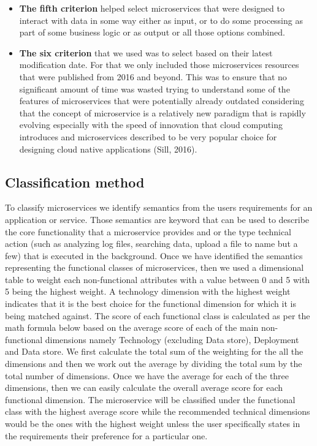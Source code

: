 \documentclass{article}
\begin{document}
\begin{itemize}
\item \textbf{The fifth criterion} helped select microservices that were designed to interact with data in some way either as input, or to do some processing as part of some business logic or as output or all those options combined.


\item \textbf{The six criterion} that we used was to select based on their latest modification date. For that we only included those microservices resources that were published from 2016 and beyond. This was to ensure that no significant amount of time was wasted trying to understand some of the features of microservices that were potentially already outdated considering that the concept of microservice is a relatively new paradigm that is rapidly evolving especially with the speed of innovation that cloud computing introduces and microservices described to be very popular choice for designing cloud native applications (Sill, 2016). 

\end{itemize}

\subsection{Classification method}

To classify microservices we identify semantics from the users requirements for an application or service. Those semantics are keyword that can be used to describe the core functionality that a microservice provides and or the type technical action (such as analyzing log files, searching data, upload a file to name but a few) that is executed in the background. Once we have identified the semantics representing the functional classes of microservices, then we used a dimensional table to weight each non-functional attributes with a value between 0 and 5 with 5 being the highest weight. A technology dimension with the highest weight indicates that it is the best choice for the functional dimension for which it is being matched against. The score of each functional class is calculated as per the math formula below based on the average score of each of the main non-functional dimensions namely Technology (excluding Data store), Deployment and Data store. We first calculate the total sum of the weighting for the all the dimensions and then we work out the average by dividing the total sum by the total number of dimensions. Once we have the average for each of the three dimensions, then we can easily calculate the overall average score for each functional dimension. The microservice will be classified under the functional class with the highest average score while the recommended technical dimensions would be the ones with the highest weight unless the user specifically states in the requirements their preference for a particular one.
\end{document}
